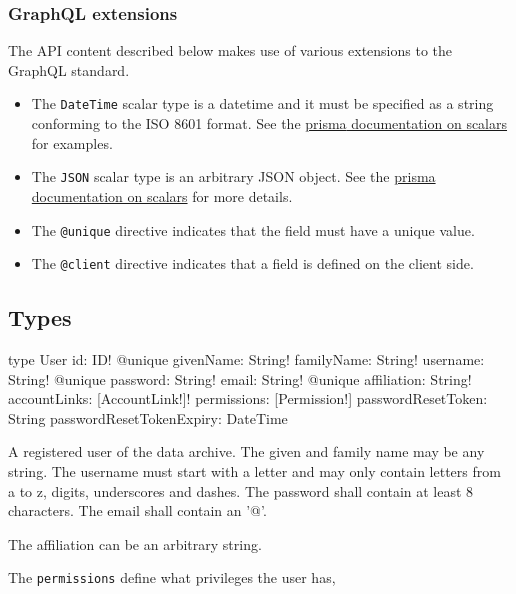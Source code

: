 \subsubsection{GraphQL extensions}

The API content described below makes use of various extensions to the GraphQL standard.

\begin{itemize}
    \item The \verb|DateTime| scalar type is a datetime and it must be specified as a string conforming to the ISO 8601 format. See the \href{https://www.prisma.io/docs/1.4/reference/service-configuration/data-modelling-(sdl)-eiroozae8u/#scalar-types}{\Gls{prisma} documentation on scalars} for examples.
    \item The \verb|JSON| scalar type is an arbitrary JSON object. See the \href{https://www.prisma.io/docs/1.4/reference/service-configuration/data-modelling-(sdl)-eiroozae8u/#scalar-types}{\Gls{prisma} documentation on scalars} for more details.
    \item The \verb|@unique| directive indicates that the field must have a unique value.
    \item The \verb|@client| directive indicates that a field is defined on the client side.
\end{itemize}

\subsection{Types}


\begin{code}
type User {
  id: ID! @unique
  givenName: String!
  familyName: String!
  username: String! @unique
  password: String!
  email: String! @unique
  affiliation: String!
  accountLinks: [AccountLink!]!
  permissions: [Permission!]
  passwordResetToken: String
  passwordResetTokenExpiry: DateTime
}
\end{code}

A registered user of the data archive. The given and family name may be any string. The username must start with a letter and may only contain letters from a to z, digits, underscores and dashes. The password shall contain at least 8 characters. The email shall contain an '@'.

The affiliation can be an arbitrary string.

The \verb|permissions| define what privileges the user has,

